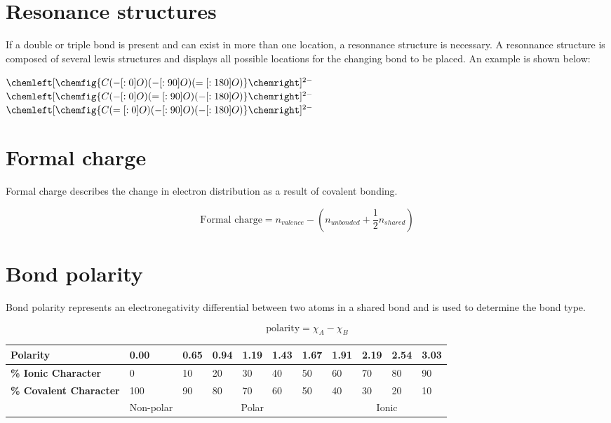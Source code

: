 \section{Resonance structures}
If a double or triple bond is present and can exist in more than one location, a
resonnance structure is necessary. A resonnance structure is composed of several
lewis structures and displays all possible locations for the changing bond to be
placed. An example is shown below:

$\chemleft[\chemfig{C(-[:0]O)(-[:90]O)(=[:180]O)}\chemright]^{2-}$
$\chemleft[\chemfig{C(-[:0]O)(=[:90]O)(-[:180]O)}\chemright]^{2-}$
$\chemleft[\chemfig{C(=[:0]O)(-[:90]O)(-[:180]O)}\chemright]^{2-}$

\section{Formal charge}
Formal charge describes the change in electron distribution as a result of
covalent bonding.

\begin{equation}
  \text{Formal charge} = n_{valence} - (n_{unbonded} + \frac{1}{2}n_{shared})
\end{equation}

\section{Bond polarity}
Bond polarity represents an electronegativity differential between two atoms in
a shared bond and is used to determine the bond type.

\begin{equation}
  \text{polarity} = \chi_A - \chi_B
\end{equation}

\begin{table}[]
\centering
\begin{tabular}{l|l|l|l|l|l|l|l|l|l|l|}
\hline
\multicolumn{1}{|l|}{\textbf{Polarity}}              & 0.00                           & 0.65 & 0.94 & 1.19 & 1.43 & 1.67 & 1.91  & 2.19 & 2.54 & 3.03 \\ \hline
\multicolumn{1}{|l|}{\textbf{\% Ionic Character}}    & 0                              & 10   & 20   & 30   & 40   & 50   & 60    & 70   & 80   & 90   \\ \hline
\multicolumn{1}{|l|}{\textbf{\% Covalent Character}} & 100                            & 90   & 80   & 70   & 60   & 50   & 40    & 30   & 20   & 10   \\ \hline
                                                     & \multicolumn{1}{c|}{Non-polar} & \multicolumn{5}{c|}{Polar}       & \multicolumn{4}{c|}{Ionic} \\ \cline{2-11}
\end{tabular}
\end{table}

